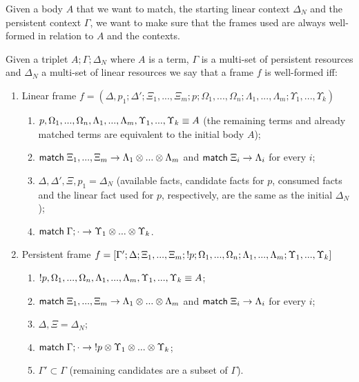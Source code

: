 Given a body $A$ that we want to match, the starting linear context $\Delta_{N}$ and the persistent context $\Gamma$, we want to
make sure that the frames used are always well-formed in relation to $A$ and the contexts.

\begin{definition}

Given a triplet $A; \Gamma; \Delta_{N}$ where $A$ is a term, $\Gamma$ is a multi-set of persistent resources and $\Delta_{N}$ a multi-set of linear resources we say that a frame $f$ is well-formed iff:

\begin{enumerate}
   \item Linear frame $f = (\Delta, p_1; \Delta'; \Xi_1, ..., \Xi_m; p; \Omega_1, ..., \Omega_n; \Lambda_1, ..., \Lambda_m; \Upsilon_1, ..., \Upsilon_k)$
   \begin{enumerate}
      \item $p, \Omega_1, ..., \Omega_n, \Lambda_1, ..., \Lambda_m, \Upsilon_1, ..., \Upsilon_k \equiv A$ (the remaining terms and already matched terms are equivalent to the initial body $A$);
      \item $\mathsf{match} \; \Xi_1, ..., \Xi_m \rightarrow \Lambda_1 \otimes ... \otimes \Lambda_m$ and $\mathsf{match} \; \Xi_i \rightarrow \Lambda_i$ for every $i$;
      \item $\Delta, \Delta', \Xi, p_1 = \Delta_{N}$ (available facts, candidate facts for $p$, consumed facts and the linear fact used for $p$, respectively, are the same as the initial $\Delta_{N}$);
      \item $\mathsf{match} \; \Gamma; \cdot \rightarrow \Upsilon_1 \otimes ... \otimes \Upsilon_k$.
   \end{enumerate}
   \item Persistent frame $f = [\Gamma'; \Delta; \Xi_1, ..., \Xi_m; {!} p; \Omega_1, ..., \Omega_n; \Lambda_1, ..., \Lambda_m; \Upsilon_1, ..., \Upsilon_k]$
      \begin{enumerate}
         \item ${!} p, \Omega_1, ..., \Omega_n, \Lambda_1, ..., \Lambda_m, \Upsilon_1, ..., \Upsilon_k \equiv A$;
         \item $\mathsf{match} \; \Xi_1, ..., \Xi_m \rightarrow \Lambda_1 \otimes ... \otimes \Lambda_m$ and $\mathsf{match} \; \Xi_i \rightarrow \Lambda_i$ for every $i$;
         \item $\Delta, \Xi = \Delta_{N}$;
         \item $\mathsf{match} \; \Gamma; \cdot \rightarrow {!} p \otimes \Upsilon_1 \otimes ... \otimes \Upsilon_k$;
         \item $\Gamma' \subset \Gamma$ (remaining candidates are a subset of $\Gamma$).
      \end{enumerate}
\end{enumerate}
\end{definition}

